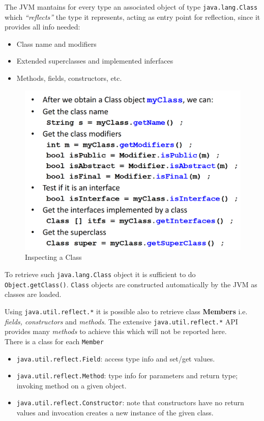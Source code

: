 \begin{paracol}{2}
    \colfill
    {The JVM mantains for every type an associated object of type \lstinline{java.lang.Class} which \textit{``reflects''} the type it represents,
    acting as entry point for reflection,
    since it provides all info needed:\ns
    \begin{itemize}
        \item Class name and modifiers
        \item Extended superclasses and implemented inferfaces
        \item Methods, fields, constructors, etc.
    \end{itemize}
    }
    \colfill

    \switchcolumn

    \begin{figure}[htbp]
        \centering
        \includegraphics{images/reflection_class.png}
        \caption{Inspecting a Class}
        \label{fig:reflection_class}
    \end{figure}

\end{paracol}

To retrieve such \lstinline{java.lang.Class} object it is sufficient to do \lstinline{Object.getClass()}.
\lstinline{Class} objects are constructed automatically by the JVM as classes are loaded.

Using \lstinline{java.util.reflect.*} it is possible also to retrieve class \textbf{Members} i.e. \textit{fields, constructors} and \textit{methods}.
The extensive \lstinline{java.util.reflect.*} API provides many \textit{methods} to achieve this which will not be reported here.\\
There is a class for each \texttt{Member}
\begin{itemize}
    \item \lstinline{java.util.reflect.Field}: access type info and set/get values.
    \item \lstinline{java.util.reflect.Method}: type info for parameters and return type;
    invoking method on a given object.
    \item \lstinline{java.util.reflect.Constructor}: note that constructors have no return values and invocation creates a new instance of the given class.
\end{itemize}



